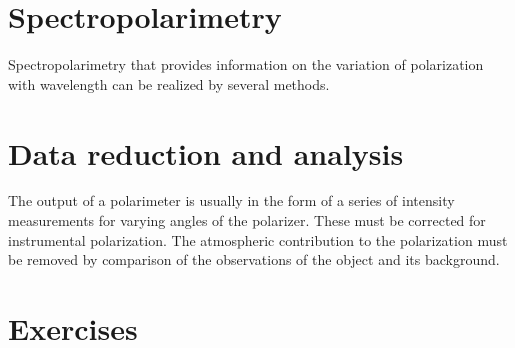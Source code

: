 \section{Spectropolarimetry}
Spectropolarimetry that provides information on the variation of polarization with wavelength can be realized by several methods. 

\section{Data reduction and analysis}

The output of a polarimeter is usually in the form of a series of
intensity measurements for varying angles of the polarizer. These must
be corrected for instrumental polarization. The atmospheric
contribution to the polarization must be removed by comparison of the
observations of the object  and its background. 

\section{Exercises}

